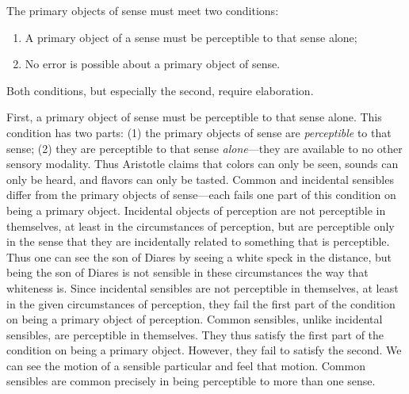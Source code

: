 The primary objects of sense must meet two conditions: 
\begin{enumerate}[(1)]
	\item A primary object of a sense must be perceptible to that sense alone;
	\item No error is possible about a primary object of sense.
\end{enumerate}
Both conditions, but especially the second, require elaboration.

First, a primary object of sense must be perceptible to that sense alone. This condition has two parts: (1) the primary objects of sense are \emph{perceptible} to that sense; (2) they are perceptible to that sense \emph{alone}---they are available to no other sensory modality. Thus Aristotle claims that colors can only be seen, sounds can only be heard, and flavors can only be tasted. Common and incidental sensibles differ from the primary objects of sense---each fails one part of this condition on being a primary object. Incidental objects of perception are not perceptible in themselves, at least in the circumstances of perception, but are perceptible only in the sense that they are incidentally related to something that is perceptible. Thus one can see the son of Diares by seeing a white speck in the distance, but being the son of Diares is not sensible in these circumstances the way that whiteness is. Since incidental sensibles are not perceptible in themselves, at least in the given circumstances of perception, they fail the first part of the condition on being a primary object of perception. Common sensibles, unlike incidental sensibles, are perceptible in themselves. They thus satisfy the first part of the condition on being a primary object. However, they fail to satisfy the second. We can see the motion of a sensible particular and feel that motion. Common sensibles are common precisely in being perceptible to more than one sense.

